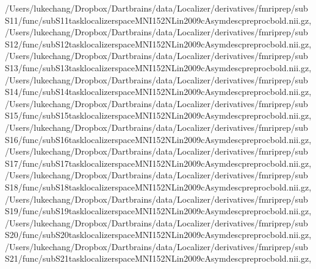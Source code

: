 \documentclass[letterpaper,10pt,english]{sphinxmanual}
\begin{document}
\begin{sphinxVerbatim}[commandchars=\\\{\}]
 \PYGZsq{}/Users/lukechang/Dropbox/Dartbrains/data/Localizer/derivatives/fmriprep/sub\PYGZhy{}S11/func/sub\PYGZhy{}S11\PYGZus{}task\PYGZhy{}localizer\PYGZus{}space\PYGZhy{}MNI152NLin2009cAsym\PYGZus{}desc\PYGZhy{}preproc\PYGZus{}bold.nii.gz\PYGZsq{},
 \PYGZsq{}/Users/lukechang/Dropbox/Dartbrains/data/Localizer/derivatives/fmriprep/sub\PYGZhy{}S12/func/sub\PYGZhy{}S12\PYGZus{}task\PYGZhy{}localizer\PYGZus{}space\PYGZhy{}MNI152NLin2009cAsym\PYGZus{}desc\PYGZhy{}preproc\PYGZus{}bold.nii.gz\PYGZsq{},
 \PYGZsq{}/Users/lukechang/Dropbox/Dartbrains/data/Localizer/derivatives/fmriprep/sub\PYGZhy{}S13/func/sub\PYGZhy{}S13\PYGZus{}task\PYGZhy{}localizer\PYGZus{}space\PYGZhy{}MNI152NLin2009cAsym\PYGZus{}desc\PYGZhy{}preproc\PYGZus{}bold.nii.gz\PYGZsq{},
 \PYGZsq{}/Users/lukechang/Dropbox/Dartbrains/data/Localizer/derivatives/fmriprep/sub\PYGZhy{}S14/func/sub\PYGZhy{}S14\PYGZus{}task\PYGZhy{}localizer\PYGZus{}space\PYGZhy{}MNI152NLin2009cAsym\PYGZus{}desc\PYGZhy{}preproc\PYGZus{}bold.nii.gz\PYGZsq{},
 \PYGZsq{}/Users/lukechang/Dropbox/Dartbrains/data/Localizer/derivatives/fmriprep/sub\PYGZhy{}S15/func/sub\PYGZhy{}S15\PYGZus{}task\PYGZhy{}localizer\PYGZus{}space\PYGZhy{}MNI152NLin2009cAsym\PYGZus{}desc\PYGZhy{}preproc\PYGZus{}bold.nii.gz\PYGZsq{},
 \PYGZsq{}/Users/lukechang/Dropbox/Dartbrains/data/Localizer/derivatives/fmriprep/sub\PYGZhy{}S16/func/sub\PYGZhy{}S16\PYGZus{}task\PYGZhy{}localizer\PYGZus{}space\PYGZhy{}MNI152NLin2009cAsym\PYGZus{}desc\PYGZhy{}preproc\PYGZus{}bold.nii.gz\PYGZsq{},
 \PYGZsq{}/Users/lukechang/Dropbox/Dartbrains/data/Localizer/derivatives/fmriprep/sub\PYGZhy{}S17/func/sub\PYGZhy{}S17\PYGZus{}task\PYGZhy{}localizer\PYGZus{}space\PYGZhy{}MNI152NLin2009cAsym\PYGZus{}desc\PYGZhy{}preproc\PYGZus{}bold.nii.gz\PYGZsq{},
 \PYGZsq{}/Users/lukechang/Dropbox/Dartbrains/data/Localizer/derivatives/fmriprep/sub\PYGZhy{}S18/func/sub\PYGZhy{}S18\PYGZus{}task\PYGZhy{}localizer\PYGZus{}space\PYGZhy{}MNI152NLin2009cAsym\PYGZus{}desc\PYGZhy{}preproc\PYGZus{}bold.nii.gz\PYGZsq{},
 \PYGZsq{}/Users/lukechang/Dropbox/Dartbrains/data/Localizer/derivatives/fmriprep/sub\PYGZhy{}S19/func/sub\PYGZhy{}S19\PYGZus{}task\PYGZhy{}localizer\PYGZus{}space\PYGZhy{}MNI152NLin2009cAsym\PYGZus{}desc\PYGZhy{}preproc\PYGZus{}bold.nii.gz\PYGZsq{},
 \PYGZsq{}/Users/lukechang/Dropbox/Dartbrains/data/Localizer/derivatives/fmriprep/sub\PYGZhy{}S20/func/sub\PYGZhy{}S20\PYGZus{}task\PYGZhy{}localizer\PYGZus{}space\PYGZhy{}MNI152NLin2009cAsym\PYGZus{}desc\PYGZhy{}preproc\PYGZus{}bold.nii.gz\PYGZsq{},
 \PYGZsq{}/Users/lukechang/Dropbox/Dartbrains/data/Localizer/derivatives/fmriprep/sub\PYGZhy{}S21/func/sub\PYGZhy{}S21\PYGZus{}task\PYGZhy{}localizer\PYGZus{}space\PYGZhy{}MNI152NLin2009cAsym\PYGZus{}desc\PYGZhy{}preproc\PYGZus{}bold.nii.gz\PYGZsq{},

\end{sphinxVerbatim}
\end{document}
